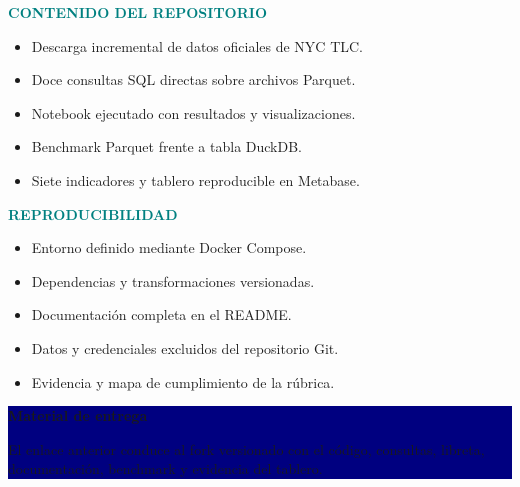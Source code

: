 \documentclass[11pt,letterpaper]{article}
\newcommand{\labeltext}[1]{\textcolor{teal}{\bfseries\MakeUppercase{#1}}}
\begin{document}
\vspace{12pt}
\begin{minipage}[t]{0.48\textwidth}
  \labeltext{Contenido del repositorio}
  \begin{itemize}
    \item Descarga incremental de datos oficiales de NYC TLC.
    \item Doce consultas SQL directas sobre archivos Parquet.
    \item Notebook ejecutado con resultados y visualizaciones.
    \item Benchmark Parquet frente a tabla DuckDB.
    \item Siete indicadores y tablero reproducible en Metabase.
  \end{itemize}
\end{minipage}\hfill
\begin{minipage}[t]{0.48\textwidth}
  \labeltext{Reproducibilidad}
  \begin{itemize}
    \item Entorno definido mediante Docker Compose.
    \item Dependencias y transformaciones versionadas.
    \item Documentación completa en el README.
    \item Datos y credenciales excluidos del repositorio Git.
    \item Evidencia y mapa de cumplimiento de la rúbrica.
  \end{itemize}
\end{minipage}

\vfill
\colorbox{navy}{%
  \parbox{\dimexpr\textwidth-2\fboxsep\relax}{%
    \vspace{7pt}
    \centering\color{white}
    \textbf{Material de entrega}\par
    El enlace anterior conduce al fork versionado con el código, consultas, libreta, documentación, benchmark y evidencia del tablero.
    \vspace{7pt}
  }%
}
\end{document}

